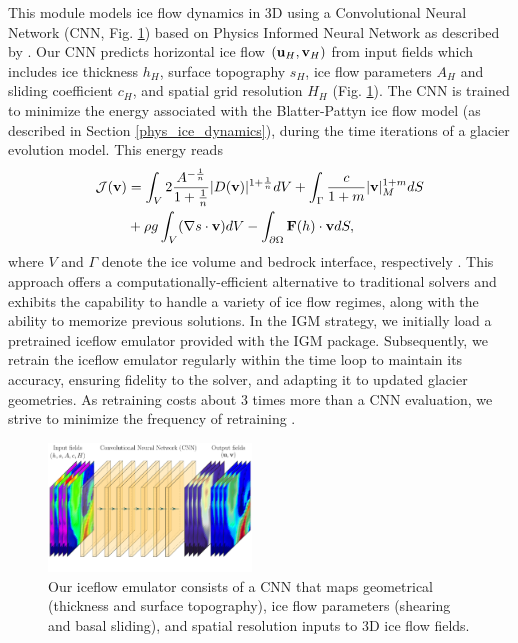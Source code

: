 \documentclass[10pt,twocolumn]{article}
\begin{document}
This module models ice flow dynamics in 3D using a Convolutional Neural Network 
(CNN, Fig. \ref{mapping-illu})
based on Physics Informed Neural Network as described by \citet{jouvet2023ice}. 
Our CNN predicts horizontal ice flow $({\bf u}_H, {\bf v}_H)$ from input fields 
which includes ice thickness $h_H$, surface topography $s_H$, ice flow parameters $A_H$ 
and sliding coefficient $c_H$, and spatial grid resolution $H_H$ (Fig. \ref{mapping-illu}). 
The CNN is trained to minimize the energy associated with the Blatter-Pattyn 
ice flow model (as described in Section \ref{phys_ice_dynamics}), 
during the time iterations of a glacier evolution model. This energy reads
\begin{align}
\mathcal{J} ({\bf v}) & =
\int_{V} 2 \frac{A^{-\frac{1}{n}}}{1+\frac{1}{n}} |  D ({\bf v}) |^{1+\frac{1}{n}}  dV  
+  \int_{\Gamma} \frac{c}{1+m}  |{\bf v}|^{1+m}_M   dS  \nonumber \\
& +  \rho g \int_{V} ( \nabla s \cdot {\bf v} ) dV
- \int_{\partial \Omega} {\bf F}(h) \cdot {\bf v}  dS,
\label{functional}
\end{align}
where $V$ and $\Gamma$ denote the ice volume and bedrock interface, respectively \citep{jouvet2023ice}.
This approach offers a computationally-efficient alternative to traditional solvers and exhibits the capability 
to handle a variety of ice flow regimes, along with the ability to memorize previous solutions.
In the IGM strategy, we initially load a pretrained iceflow emulator provided with the IGM package. 
Subsequently, we retrain the iceflow emulator regularly within 
the time loop to maintain its accuracy, ensuring fidelity to the solver, and adapting 
it to updated glacier geometries. As retraining costs about 3 times more than a CNN evaluation,
we strive to minimize the frequency of retraining \citep{jouvet2023ice}. 

\begin{figure}[!ht]
\begin{center}
\includegraphics[width=0.48\textwidth]{fig/mapping-illu7.pdf}
\caption{\label{mapping-illu} Our iceflow emulator consists of a CNN that maps 
geometrical (thickness and surface topography), ice flow parameters 
(shearing and basal sliding), and spatial resolution inputs to 3D ice flow fields.}
\end{center}
\end{figure}
\end{document}
